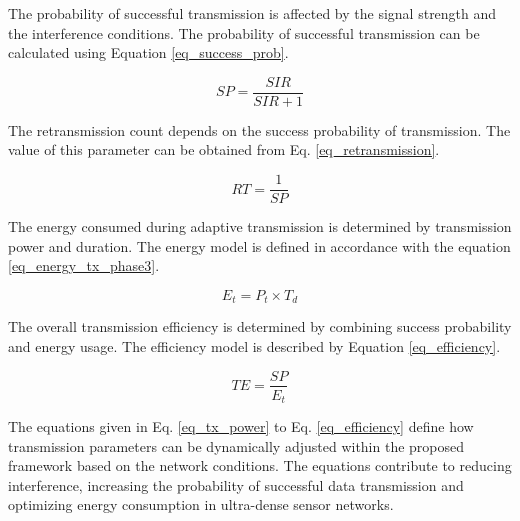 \documentclass[a4paper,fleqn]{cas-dc}
\numberwithin{equation}{section}
\begin{document}
The probability of successful transmission is affected by the signal strength and the interference conditions. The probability of successful transmission can be calculated using Equation \ref{eq_success_prob}.

\begin{equation}
SP = \frac{SIR}{SIR + 1}
\label{eq_success_prob}
\end{equation}

The retransmission count depends on the success probability of transmission. The value of this parameter can be obtained from Eq. \ref{eq_retransmission}.

\begin{equation}
RT = \frac{1}{SP}
\label{eq_retransmission}
\end{equation}

The energy consumed during adaptive transmission is determined by transmission power and duration. The energy model is defined in accordance with the equation \ref{eq_energy_tx_phase3}.

\begin{equation}
E_t = P_t \times T_d
\label{eq_energy_tx_phase3}
\end{equation}

The overall transmission efficiency is determined by combining success probability and energy usage. The efficiency model is described by Equation \ref{eq_efficiency}.

\begin{equation}
TE = \frac{SP}{E_t}
\label{eq_efficiency}
\end{equation}

The equations given in Eq. \ref{eq_tx_power} to Eq. \ref{eq_efficiency} define how transmission parameters can be dynamically adjusted within the proposed framework based on the network conditions. The equations contribute to reducing interference, increasing the probability of successful data transmission and optimizing energy consumption in ultra-dense sensor networks.
\end{document}
